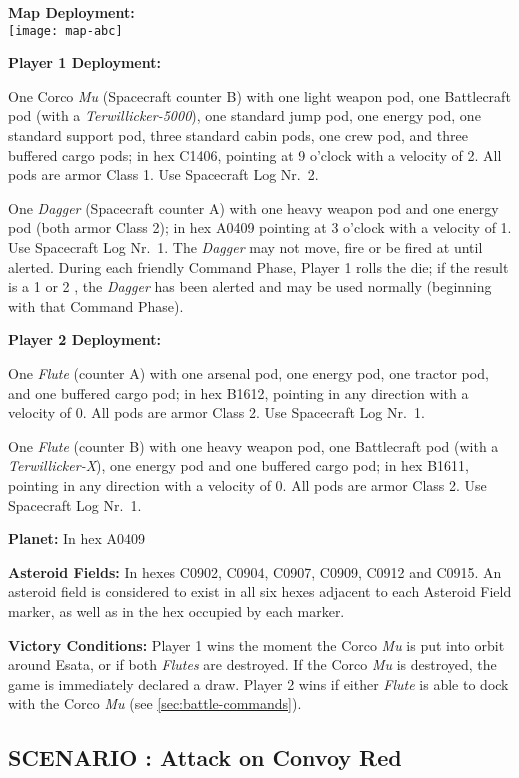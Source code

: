 \textbf{Map Deployment:}\\ 
\texttt{[image: map-abc]}

\textbf{Player 1 Deployment:}

One Corco \emph{Mu} (Spacecraft counter B) with one light weapon pod,
one Battlecraft pod (with a \emph{Terwillicker-5000}), one standard
jump pod, one energy pod, one standard support pod, three standard
cabin pods, one crew pod, and three buffered cargo pods; in hex C1406,
pointing at 9 o'clock with a velocity of 2. All pods are armor Class
1. Use Spacecraft Log Nr.~2.

One \emph{Dagger} (Spacecraft counter A) with one heavy weapon pod and
one energy pod (both armor Class 2); in hex A0409 pointing at 3
o'clock with a velocity of 1. Use Spacecraft Log Nr.~1. The
\emph{Dagger} may not move, fire or be fired at until alerted. During
each friendly Command Phase, Player 1 rolls the die; if the result is
a 1 or 2 , the \emph{Dagger} has been alerted and may be used normally
(beginning with that Command Phase).

\textbf{Player 2 Deployment:}

One \emph{Flute} (counter A) with one arsenal pod, one energy pod, one
tractor pod, and one buffered cargo pod; in hex B1612, pointing in any
direction with a velocity of 0. All pods are armor Class 2. Use
Spacecraft Log Nr.~1.

One \emph{Flute} (counter B) with one heavy weapon pod, one
Battlecraft pod (with a \emph{Terwillicker-X}), one energy pod and one
buffered cargo pod; in hex B1611, pointing in any direction with a
velocity of 0. All pods are armor Class 2. Use Spacecraft Log Nr.~1.

\textbf{Planet:} In hex A0409

\textbf{Asteroid Fields:} In hexes C0902, C0904, C0907, C0909, C0912
and C0915. An asteroid field is considered to exist in all six hexes
adjacent to each Asteroid Field marker, as well as in the hex occupied
by each marker.

\textbf{Victory Conditions:} Player 1 wins the moment the Corco
\emph{Mu} is put into orbit around Esata, or if both \emph{Flutes} are
destroyed. If the Corco \emph{Mu} is destroyed, the game is
immediately declared a draw. Player 2 wins if either \emph{Flute} is
able to dock with the Corco \emph{Mu} (see \ref{sec:battle-commands}).



\subsection*{SCENARIO \thescenario: Attack on Convoy Red}
\label{sec:scenario-5:-attack}


